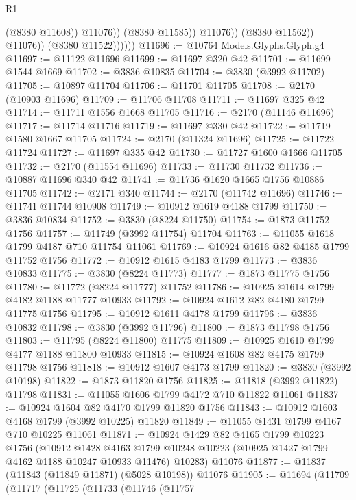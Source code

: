 \begin{lexlean}{R1}
\begin{coremodule}
                                (@8380 @11608))
                              @11076))
                          (@8380 @11585))
                        @11076))
                    (@8380 @11562))
                  @11076))
              (@8380 @11522))))))
@11696 := @10764 Models.Glyphs.Glyph.g4
@11697 := @11122 @11696
@11699 := @11697 @320 @42
@11701 := @11699 @1544 @1669
@11702 := @3836 @10835
@11704 := @3830 (@3992 @11702)
@11705 := @10897 @11704
@11706 := @11701 @11705
@11708 := @2170 (@10903 @11696)
@11709 := @11706 @11708
@11711 := @11697 @325 @42
@11714 := @11711 @1556 @1668 @11705
@11716 := @2170 (@11146 @11696)
@11717 := @11714 @11716
@11719 := @11697 @330 @42
@11722 := @11719 @1580 @1667 @11705
@11724 := @2170 (@11324 @11696)
@11725 := @11722 @11724
@11727 := @11697 @335 @42
@11730 := @11727 @1600 @1666 @11705
@11732 := @2170 (@11554 @11696)
@11733 := @11730 @11732
@11736 := @10887 @11696 @340 @42
@11741 := @11736 @1620 @1665 @1756 @10886 @11705
@11742 := @2171 @340
@11744 := @2170 (@11742 @11696)
@11746 := @11741 @11744 @10908
@11749 := @10912 @1619 @4188 @1799
@11750 := @3836 @10834
@11752 := @3830 (@8224 @11750)
@11754 := @1873 @11752 @1756
@11757 := @11749 (@3992 @11754) @11704
@11763 := @11055 @1618 @1799 @4187 @710 @11754 @11061
@11769 := @10924 @1616 @82 @4185 @1799 @11752 @1756
@11772 := @10912 @1615 @4183 @1799
@11773 := @3836 @10833
@11775 := @3830 (@8224 @11773)
@11777 := @1873 @11775 @1756
@11780 := @11772 (@8224 @11777) @11752
@11786 := @10925 @1614 @1799 @4182 @1188 @11777 @10933
@11792 := @10924 @1612 @82 @4180 @1799 @11775 @1756
@11795 := @10912 @1611 @4178 @1799
@11796 := @3836 @10832
@11798 := @3830 (@3992 @11796)
@11800 := @1873 @11798 @1756
@11803 := @11795 (@8224 @11800) @11775
@11809 := @10925 @1610 @1799 @4177 @1188 @11800 @10933
@11815 := @10924 @1608 @82 @4175 @1799 @11798 @1756
@11818 := @10912 @1607 @4173 @1799
@11820 := @3830 (@3992 @10198)
@11822 := @1873 @11820 @1756
@11825 := @11818 (@3992 @11822) @11798
@11831 := @11055 @1606 @1799 @4172 @710 @11822 @11061
@11837 := @10924 @1604 @82 @4170 @1799 @11820 @1756
@11843 := @10912 @1603 @4168 @1799 (@3992 @10225) @11820
@11849 := @11055 @1431 @1799 @4167 @710 @10225 @11061
@11871 := @10924
    @1429
    @82
    @4165
    @1799
    @10223
    @1756
    (@10912
      @1428
      @4163
      @1799
      @10248
      @10223
      (@10925 @1427 @1799 @4162 @1188 @10247 @10933 @11476)
      @10283)
    @11076
@11877 := @11837 (@11843 (@11849 @11871) (@5028 @10198)) @11076
@11905 := @11694
    (@11709
      (@11717
        (@11725
          (@11733
            (@11746
              (@11757

\end{coremodule}
\end{lexlean}
